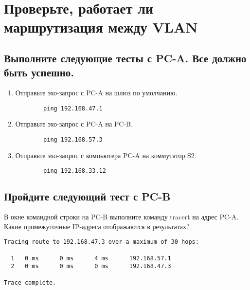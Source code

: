 \section{Проверьте, работает ли маршрутизация между VLAN}
\subsection{Выполните следующие тесты с PC-A. Все должно быть успешно.}
\begin{enumerate}[a]
    \item Отправьте эхо-запрос с PC-A на шлюз по умолчанию.
    \begin{verbatim}
        ping 192.168.47.1
    \end{verbatim}

    \item Отправьте эхо-запрос с PC-A на PC-B\@.
    \begin{verbatim}
        ping 192.168.57.3
    \end{verbatim}

    \item Отправьте эхо-запрос с компьютера PC-A на коммутатор S2.
    \begin{verbatim}
        ping 192.168.33.12
    \end{verbatim}
\end{enumerate}

\subsection{Пройдите следующий тест с PC-B}
В окне командной строки на PC-B выполните команду tracert на адрес PC-A.
Какие промежуточные IP-адреса отображаются в результатах?
\begin{verbatim}
Tracing route to 192.168.47.3 over a maximum of 30 hops:

  1   0 ms      0 ms      4 ms      192.168.57.1
  2   0 ms      0 ms      0 ms      192.168.47.3

Trace complete.
\end{verbatim}